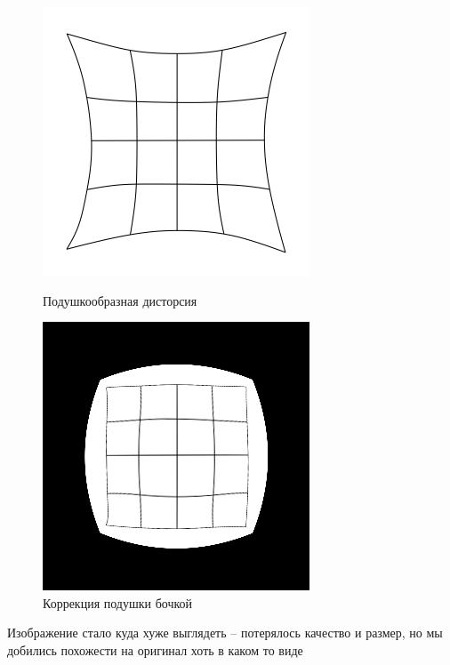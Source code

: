 \documentclass[a4paper, 16pt]{article}
\begin{document}
\begin{figure}[!htb]
    \centering
    \begin{minipage}{0.45\textwidth}
        \centering
        \includegraphics{pipillow.png}
        \captionsetup{skip=0pt}
        \caption{Подушкообразная дисторсия}
        \label{Рис:20}
    \end{minipage}
    \begin{minipage}{0.45\textwidth}
        \centering
        \includegraphics[scale=0.5]{undistort_pin.png}
        \captionsetup{skip=0pt}
        \caption{Коррекция подушки бочкой}
        \label{Рис:21}
    \end{minipage}
\end{figure}


\noindent Изображение стало куда хуже выглядеть -- потерялось качество
и размер, но мы добились похожести на оригинал хоть в каком то виде
\end{document}
